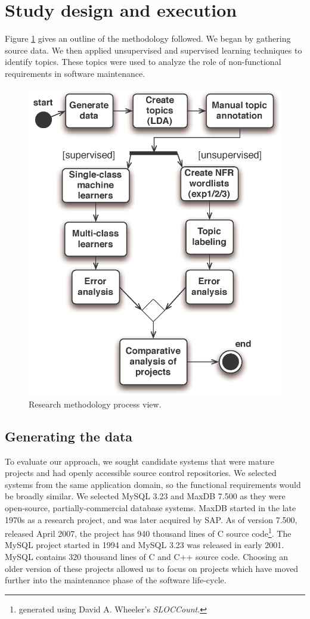 \documentclass[]{sig-alternate}
\begin{document}


\section{Study design and execution}
Figure \ref{fig:process} gives an outline of the methodology followed. 
We began by gathering source data. 
We then applied unsupervised and supervised learning techniques to identify topics. 
These topics were used to analyze the role of non-functional requirements in software maintenance.

\begin{figure}
  \centering
 \includegraphics[width=.45\textwidth]{figures/process-model}
 \caption{Research methodology process view.}
  \label{fig:process}
\end{figure}

\subsection{Generating the data}
\label{sec:wordlist}

To evaluate our approach, we sought candidate systems that were mature projects and had openly accessible source control repositories. 
We selected systems from the same application domain, so the functional requirements would be broadly similar. 
We selected MySQL 3.23 and MaxDB 7.500 as they were open-source, partially-commercial database systems. 
MaxDB started in the late 1970s as a research project, and was later acquired by SAP. 
As of version 7.500, released April 2007, the project has 940 thousand lines of C source code\footnote{generated using David A. Wheeler's \emph{SLOCCount}.}. 
The MySQL project started in 1994 and MySQL 3.23 was released in early 2001. 
MySQL contains 320 thousand lines of C and C++ source code.  
Choosing an older version of these projects allowed us to focus on projects which have moved further into the maintenance phase of the software life-cycle.
\end{document}
